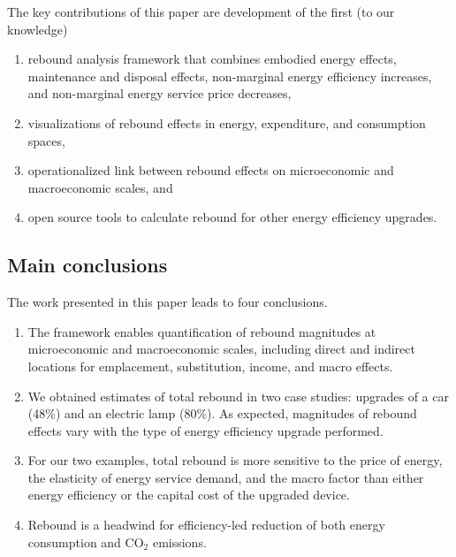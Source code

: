 \documentclass[12pt]{article}    %
\begin{document}
The key contributions of this paper are 
development of the first (to our knowledge)
%
\begin{enumerate}[label={(\roman*)}]
	
  \item rebound analysis framework that combines 
        embodied energy effects, 
        maintenance and disposal effects, 
        non-marginal energy efficiency increases, and 
        non-marginal energy service price decreases, 

  \item visualizations of rebound effects
        in energy, expenditure, and consumption spaces,
        
  \item operationalized link between 
        rebound effects on microeconomic and macroeconomic scales, and 
        
  \item open source tools to calculate rebound 
        for other energy efficiency upgrades.
  
\end{enumerate}


\subsection*{Main conclusions}
\label{sec:conclusions}

The work presented in this paper leads to four conclusions.
%
\begin{enumerate}[label={(\roman*)}]

  \item The framework enables
        quantification of rebound magnitudes at microeconomic and macroeconomic scales, including 
        direct and indirect locations 
        for emplacement, substitution, income, and macro effects.
        
  \item We obtained estimates of total rebound in two case studies: 
        upgrades of a car (48\%) and an electric lamp (80\%).
        As expected, magnitudes of rebound effects
        vary with the type of energy efficiency upgrade performed.
        
  \item For our two examples, total rebound is   
        more sensitive to
        the price of energy,
        the elasticity of energy service demand, and
        the macro factor
        than either
        energy efficiency or
        the capital cost of the upgraded device.
        
  \item Rebound is a headwind for efficiency-led reduction of both energy consumption 
        and CO$_2$ emissions.

\end{enumerate}
\end{document}

